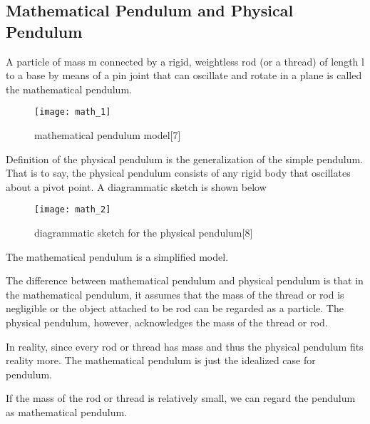 \documentclass{article}
\begin{document}
\subsection{Mathematical Pendulum and Physical Pendulum}
\par A particle of mass m connected by a rigid, weightless rod (or a thread) of length l to a base by means of a pin joint that can oscillate and rotate in a plane is called the mathematical pendulum. 
\begin{figure}[H]
  \centering
  \texttt{[image: math\_1]}
  \caption{mathematical pendulum model[7]}
\end{figure}
Definition of the physical pendulum is the generalization of the simple pendulum. That is to say, the physical pendulum consists of any rigid body that oscillates about a pivot point. A diagrammatic sketch is shown below 
\begin{figure}[H]
  \centering
  \texttt{[image: math\_2]}
  \caption{diagrammatic sketch for the physical pendulum[8]}
\end{figure}
The mathematical pendulum is a simplified model.
 	\par The difference between mathematical pendulum and physical pendulum is that in the mathematical pendulum, it assumes that the mass of the thread or rod is negligible or the object attached to be rod can be regarded as a particle. The physical pendulum, however, acknowledges the mass of the thread or rod.
	\par In reality, since every rod or thread has mass and thus the physical pendulum fits reality more. 
The mathematical pendulum is just the idealized case for pendulum.
	\par If the mass of the rod or thread is relatively small, we can regard the pendulum as mathematical pendulum. 
\end{document}
